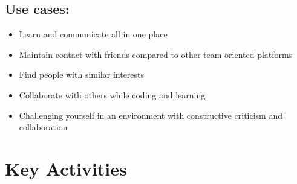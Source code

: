 \documentclass[10pt,titlepage]{article}
\begin{document}
	\subsection*{Use cases:} 
	\begin{itemize}
		\item Learn and communicate all in one place
		\item Maintain contact with friends compared to other team oriented platforms 
		\item Find people with similar interests  
        \item Collaborate with others while coding and learning
        \item Challenging yourself in an environment with constructive criticism and collaboration
	\end{itemize}
	
	
	\pagebreak
	\section*{Key Activities}
\end{document}
